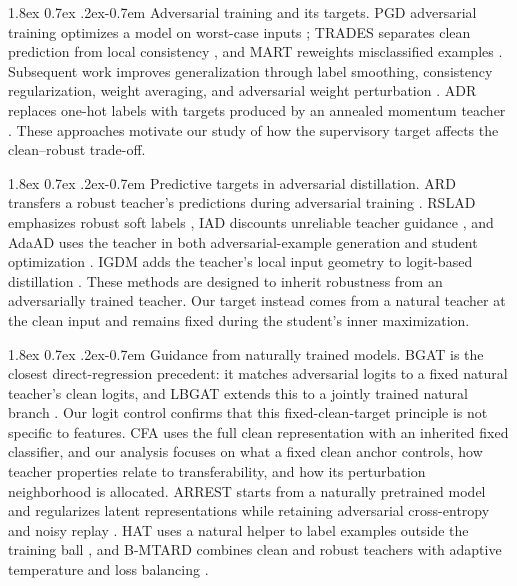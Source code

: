\documentclass{article} %
\makeatletter
\theoremstyle{plain}
\renewcommand{\paragraph}{\@startsection{paragraph}{4}{\z@}%
  {1.8ex \@plus 0.7ex \@minus .2ex}{-0.7em}%
  {\normalfont\normalsize\bfseries}}
\makeatother
\begin{document}
\paragraph{Adversarial training and its targets.}
PGD adversarial training optimizes a model on worst-case inputs \citep{PGD}; TRADES separates clean
prediction from local consistency \citep{TRADES}, and MART reweights misclassified examples
\citep{MART}. Subsequent work improves generalization through label smoothing, consistency
regularization, weight averaging, and adversarial weight perturbation
\citep{pang2020bag,tack2022consistency,robustoverfit,2020_awp}. ADR replaces one-hot labels with
targets produced by an annealed momentum teacher \citep{adr}. These approaches motivate our study
of how the supervisory target affects the clean--robust trade-off.

\paragraph{Predictive targets in adversarial distillation.}
ARD transfers a robust teacher's predictions during adversarial training \citep{ard}. RSLAD emphasizes
robust soft labels \citep{rslad}, IAD discounts unreliable teacher guidance \citep{iad}, and AdaAD uses
the teacher in both adversarial-example generation and student optimization \citep{adaad}. IGDM adds
the teacher's local input geometry to logit-based distillation \citep{igdm}. These methods are designed
to inherit robustness from an adversarially trained teacher. Our target instead comes from a natural
teacher at the clean input and remains fixed during the student's inner maximization.

\paragraph{Guidance from naturally trained models.}
BGAT is the closest direct-regression precedent: it matches adversarial logits to a fixed natural
teacher's clean logits, and LBGAT extends this to a jointly trained natural branch \citep{lbgat}.
Our logit control confirms that this fixed-clean-target principle is not specific to features. CFA
uses the full clean representation with an inherited fixed classifier, and our analysis focuses on
what a fixed clean anchor controls, how teacher properties relate to transferability, and how its
perturbation neighborhood is allocated. ARREST starts
from a naturally pretrained model and regularizes latent representations while retaining adversarial
cross-entropy and noisy replay \citep{arrest}. HAT uses a natural helper to label examples outside the
training ball \citep{hat}, and B-MTARD combines clean and robust teachers with adaptive temperature
and loss balancing \citep{bmtard}.
\end{document}
